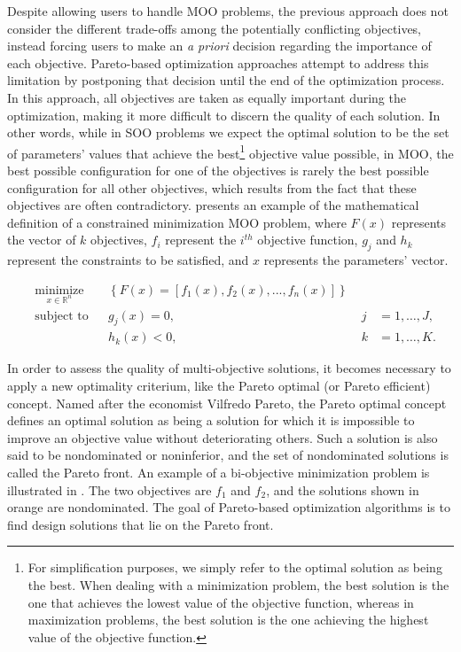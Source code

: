 	Despite allowing users to handle \ac{MOO} problems, the previous approach does not consider the different trade-offs among the potentially conflicting objectives, instead forcing users to make an \textit{a priori} decision regarding the importance of each objective. Pareto-based optimization approaches attempt to address this limitation by postponing that decision until the end of the optimization process. In this approach, all objectives are taken as equally important during the optimization, making it more difficult to discern the quality of each solution. In other words, while in \ac{SOO} problems we expect the optimal solution to be the set of parameters' values that achieve the best\footnote{For simplification purposes, we simply refer to the optimal solution as being the best. When dealing with a minimization problem, the best solution is the one that achieves the lowest value of the objective function, whereas in maximization problems, the best solution is the one achieving the highest value of the objective function.} objective value possible, in \ac{MOO}, the best possible configuration for one of the objectives is rarely the best possible configuration for all other objectives, which results from the fact that these objectives are often contradictory.  presents an example of the mathematical definition of a constrained minimization \ac{MOO} problem, where $F(x)$ represents the vector of $k$ objectives, $f_i$ represent the $i^{th}$ objective function, $g_j$ and $h_k$ represent the constraints to be satisfied, and $x$ represents the parameters' vector.
	
	\begin{equation} \label{eq:pareto-based}
	\begin{aligned}
	& \underset{x \in \mathbb{R}^n}{\text{minimize}}
	& & \left\lbrace F(x) = \left[f_1(x), f_2(x), ..., f_n(x)\right]  \right\rbrace \\
	& \text{subject to}
	& & g_j(x) = 0, & \; j &= 1, \ldots, J, \\ 
	&&& h_k(x) < 0, & \; k &= 1, \ldots, K.
	\end{aligned}
	\end{equation}
	
	In order to assess the quality of multi-objective solutions, it becomes necessary to apply a new optimality criterium, like the Pareto optimal (or Pareto efficient) concept. Named after the economist Vilfredo Pareto, the Pareto optimal concept defines an optimal solution as being a solution for which it is impossible to improve an objective value without deteriorating others. Such a solution is also said to be nondominated or noninferior, and the set of nondominated solutions is called the Pareto front. An example of a bi-objective minimization problem is illustrated in . The two objectives are $f_1$ and $f_2$, and the solutions shown in orange are nondominated. The goal of Pareto-based optimization algorithms is to find design solutions that lie on the Pareto front.
	
